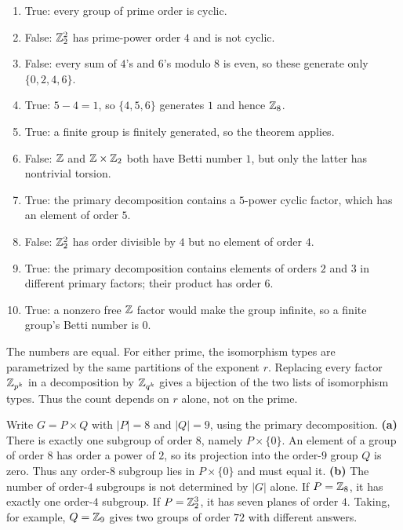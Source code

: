 \begin{enumerate}[label=(\alph*)]
\item True: every group of prime order is cyclic.
\item False: $\mathbb{Z}_2^2$ has prime-power order $4$ and is not cyclic.
\item False: every sum of $4$'s and $6$'s modulo $8$ is even, so these generate only $\{0,2,4,6\}$.
\item True: $5-4=1$, so $\{4,5,6\}$ generates $1$ and hence $\mathbb{Z}_8$.
\item True: a finite group is finitely generated, so the theorem applies.
\item False: $\mathbb{Z}$ and $\mathbb{Z}\times\mathbb{Z}_2$ both have Betti number $1$, but only the latter has nontrivial torsion.
\item True: the primary decomposition contains a $5$-power cyclic factor, which has an element of order $5$.
\item False: $\mathbb{Z}_2^2$ has order divisible by $4$ but no element of order $4$.
\item True: the primary decomposition contains elements of orders $2$ and $3$ in different primary factors; their product has order $6$.
\item True: a nonzero free $\mathbb{Z}$ factor would make the group infinite, so a finite group's Betti number is $0$.
\end{enumerate}

The numbers are equal. For either prime, the isomorphism types are parametrized by the same partitions of the exponent $r$. Replacing every factor $\mathbb{Z}_{p^k}$ in a decomposition by $\mathbb{Z}_{q^k}$ gives a bijection of the two lists of isomorphism types. Thus the count depends on $r$ alone, not on the prime.

Write $G=P\times Q$ with $|P|=8$ and $|Q|=9$, using the primary decomposition.
\textbf{(a)} There is exactly one subgroup of order $8$, namely $P\times\{0\}$. An element of a group of order $8$ has order a power of $2$, so its projection into the order-$9$ group $Q$ is zero. Thus any order-$8$ subgroup lies in $P\times\{0\}$ and must equal it.
\textbf{(b)} The number of order-$4$ subgroups is not determined by $|G|$ alone. If $P=\mathbb{Z}_8$, it has exactly one order-$4$ subgroup. If $P=\mathbb{Z}_2^3$, it has seven planes of order $4$. Taking, for example, $Q=\mathbb{Z}_9$ gives two groups of order $72$ with different answers.

